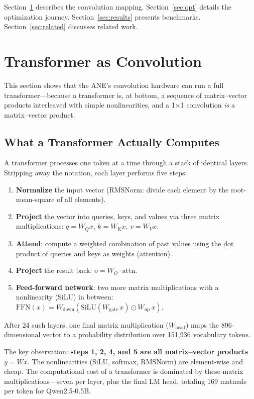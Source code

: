 \documentclass[11pt,twocolumn]{article}
\begin{document}
Section~\ref{sec:transformer} describes the convolution mapping.
Section~\ref{sec:opt} details the optimization journey.
Section~\ref{sec:results} presents benchmarks.
Section~\ref{sec:related} discusses related work.

\section{Transformer as Convolution}
\label{sec:transformer}

This section shows that the ANE's convolution hardware can run a full
transformer---because a transformer is, at bottom, a sequence of
matrix--vector products interleaved with simple nonlinearities, and a
1$\times$1 convolution \emph{is} a matrix--vector product.

\subsection{What a Transformer Actually Computes}

A transformer processes one token at a time through a stack of
identical layers.  Stripping away the notation, each layer performs
five steps:

\begin{enumerate}
\item \textbf{Normalize} the input vector (RMSNorm: divide each
  element by the root-mean-square of all elements).
\item \textbf{Project} the vector into queries, keys, and values via
  three matrix multiplications: $q = W_Q x$, $k = W_K x$, $v = W_V x$.
\item \textbf{Attend}: compute a weighted combination of past values
  using the dot product of queries and keys as weights (attention).
\item \textbf{Project} the result back: $o = W_O \cdot \mathrm{attn}$.
\item \textbf{Feed-forward network}: two more matrix multiplications
  with a nonlinearity (SiLU) in between:
  $\mathrm{FFN}(x) = W_\text{down}(\mathrm{SiLU}(W_\text{gate}\, x) \odot W_\text{up}\, x)$.
\end{enumerate}

After 24 such layers, one final matrix multiplication
($W_\text{head}$) maps the 896-dimensional vector to a probability
distribution over 151{,}936 vocabulary tokens.

The key observation: \textbf{steps 1, 2, 4, and 5 are all
matrix--vector products} $y = Wx$.  The nonlinearities (SiLU, softmax,
RMSNorm) are element-wise and cheap.  The computational cost of a
transformer is dominated by these matrix multiplications---seven per
layer, plus the final LM head, totaling 169 matmuls per token for
Qwen2.5-0.5B.
\end{document}
